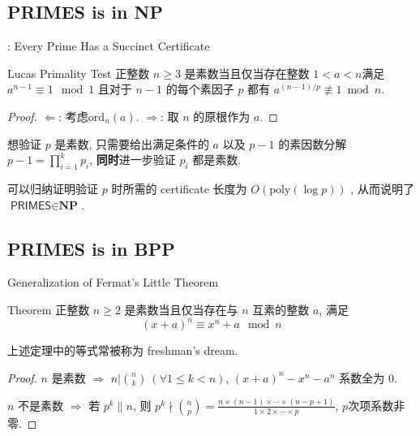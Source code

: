 \documentclass{beamer}
\def\le{\leqslant}
\def\ge{\geqslant}
\def\ord{\textrm{ord}}
\begin{document}
\subsection{PRIMES is in NP}
\begin{frame}{\cite{Pratt75}: Every Prime Has a Succinct Certificate}
	\begin{block}{Lucas Primality Test}
		正整数 $n \ge 3$ 是素数当且仅当存在整数 $1 < a < n$满足 $a^{n-1} \equiv 1 \mod 1$ 且对于 $n-1$ 的每个素因子 $p$ 都有 $a^{(n-1)/p} \not\equiv 1 \bmod n$.
	\end{block}
	\begin{proof}
		$\Leftarrow$: 考虑$\ord_{n}(a)$. $\Rightarrow$: 取 $n$ 的原根作为 $a$.
	\end{proof}
	
	想验证 $p$ 是素数, 只需要给出满足条件的 $a$ 以及 $p - 1$ 的素因数分解 $p - 1 = \prod\limits_{i=1}^{k}p_i$, \textbf{同时}进一步验证 $p_i$ 都是素数.  

	可以归纳证明验证 $p$ 时所需的 certificate 长度为 $O(\textrm{poly}(\log p))$ , 从而说明了 $\textsf{PRIMES} \in \textbf{NP}$.	
	
\end{frame}

\subsection{PRIMES is in BPP}
\begin{frame}{Generalization of Fermat's Little Theorem}
	\begin{block}{Theorem}
		正整数 $n \ge 2$ 是素数当且仅当存在与 $n$ 互素的整数 $a$, 满足 $$(x + a)^n \equiv x^n + a \mod n$$
	\end{block}

	上述定理中的等式常被称为 freshman's dream.

	\begin{proof}
		$n$ 是素数 $\Rightarrow$ $n | \binom{n}{k} \ (\forall 1 \le k < n)$, $(x + a)^n - x^n - a^n$ 系数全为 $0$.

		$n$ 不是素数 $\Rightarrow$ 若 $p^k \| n$, 则 $p^k \nmid \binom{n}{p} = \frac{n \times (n-1) \times \cdots \times (n-p+1)}{1 \times 2 \times \cdots \times p}$, $p$次项系数非零.
	\end{proof}
	
\end{frame}
\end{document}
